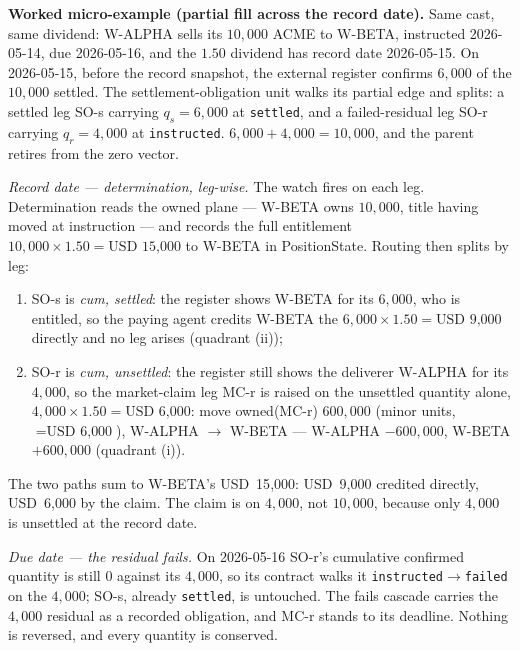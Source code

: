 \documentclass[11pt,a4paper]{article}
\newcommand{\USD}[1]{\mbox{USD~#1}}
\begin{document}
\medskip\noindent\textbf{Worked micro-example (partial fill across the record date).}
Same cast, same dividend: W-ALPHA sells its $10{,}000$ ACME to W-BETA, instructed
2026-05-14, due 2026-05-16, and the $1.50$ dividend has record date 2026-05-15. On
2026-05-15, before the record snapshot, the external register confirms $6{,}000$ of the
$10{,}000$ settled. The settlement-obligation unit walks its partial edge and splits: a
settled leg SO-s carrying $q_s = 6{,}000$ at \texttt{settled}, and a failed-residual leg
SO-r carrying $q_r = 4{,}000$ at \texttt{instructed}. $6{,}000 + 4{,}000 = 10{,}000$, and
the parent retires from the zero vector.

\emph{Record date --- determination, leg-wise.} The watch fires on each leg. Determination
reads the owned plane --- W-BETA owns $10{,}000$, title having moved at instruction --- and
records the full entitlement $10{,}000 \times 1.50 = \USD{15{,}000}$ to W-BETA in
PositionState. Routing then splits by leg:
\begin{enumerate}[label=(\arabic*),nosep]
\item SO-s is \emph{cum, settled}: the register shows W-BETA for its $6{,}000$, who is
entitled, so the paying agent credits W-BETA the $6{,}000 \times 1.50 = \USD{9{,}000}$
directly and no leg arises (quadrant (ii));
\item SO-r is \emph{cum, unsettled}: the register still shows the deliverer W-ALPHA for its
$4{,}000$, so the market-claim leg MC-r is raised on the unsettled quantity alone,
$4{,}000 \times 1.50 = \USD{6{,}000}$: move owned(MC-r) $600{,}000$ (minor units,
$=\USD{6{,}000}$), W-ALPHA $\to$ W-BETA --- W-ALPHA $-600{,}000$, W-BETA $+600{,}000$
(quadrant (i)).
\end{enumerate}
The two paths sum to W-BETA's \USD{15{,}000}: \USD{9{,}000} credited directly, \USD{6{,}000}
by the claim. The claim is on $4{,}000$, not $10{,}000$, because only $4{,}000$ is unsettled
at the record date.

\emph{Due date --- the residual fails.} On 2026-05-16 SO-r's cumulative confirmed quantity
is still $0$ against its $4{,}000$, so its contract walks it
\texttt{instructed}$\to$\texttt{failed} on the $4{,}000$; SO-s, already \texttt{settled}, is
untouched. The fails cascade carries the $4{,}000$ residual as a recorded obligation, and
MC-r stands to its deadline. Nothing is reversed, and every quantity is conserved.
\end{document}
